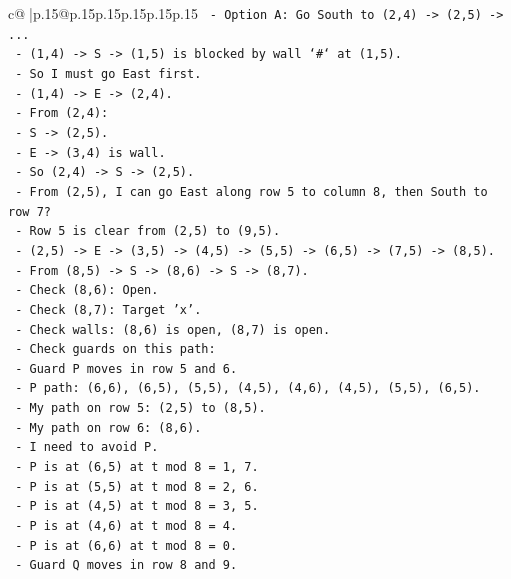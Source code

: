 \documentclass{article}
\begin{document}
{\begin{supertabular}{c@{$\;$}|p{.15\linewidth}@{}p{.15\linewidth}p{.15\linewidth}p{.15\linewidth}p{.15\linewidth}p{.15\linewidth}}
{{{\texttt{  {-} Option A: Go South to (2,4) {-}> (2,5) {-}> ...} \\
\texttt{    {-} (1,4) {-}> S {-}> (1,5) is blocked by wall `\#` at (1,5).} \\
\texttt{    {-} So I must go East first.} \\
\texttt{    {-} (1,4) {-}> E {-}> (2,4).} \\
\texttt{    {-} From (2,4):} \\
\texttt{      {-} S {-}> (2,5).} \\
\texttt{      {-} E {-}> (3,4) is wall.} \\
\texttt{    {-} So (2,4) {-}> S {-}> (2,5).} \\
\texttt{    {-} From (2,5), I can go East along row 5 to column 8, then South to row 7?} \\
\texttt{      {-} Row 5 is clear from (2,5) to (9,5).} \\
\texttt{      {-} (2,5) {-}> E {-}> (3,5) {-}> (4,5) {-}> (5,5) {-}> (6,5) {-}> (7,5) {-}> (8,5).} \\
\texttt{      {-} From (8,5) {-}> S {-}> (8,6) {-}> S {-}> (8,7).} \\
\texttt{      {-} Check (8,6): Open.} \\
\texttt{      {-} Check (8,7): Target 'x'.} \\
\texttt{      {-} Check walls: (8,6) is open, (8,7) is open.} \\
\texttt{      {-} Check guards on this path:} \\
\texttt{        {-} Guard P moves in row 5 and 6.} \\
\texttt{          {-} P path: (6,6), (6,5), (5,5), (4,5), (4,6), (4,5), (5,5), (6,5).} \\
\texttt{          {-} My path on row 5: (2,5) to (8,5).} \\
\texttt{          {-} My path on row 6: (8,6).} \\
\texttt{          {-} I need to avoid P.} \\
\texttt{          {-} P is at (6,5) at t mod 8 = 1, 7.} \\
\texttt{          {-} P is at (5,5) at t mod 8 = 2, 6.} \\
\texttt{          {-} P is at (4,5) at t mod 8 = 3, 5.} \\
\texttt{          {-} P is at (4,6) at t mod 8 = 4.} \\
\texttt{          {-} P is at (6,6) at t mod 8 = 0.} \\
\texttt{        {-} Guard Q moves in row 8 and 9.} \\
}}}
\end{supertabular}}
\end{document}
